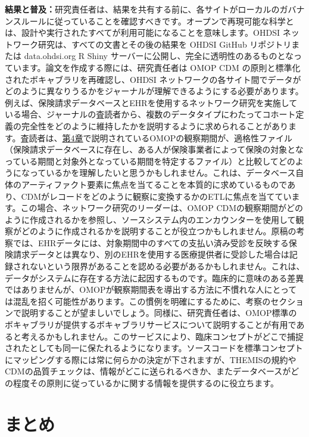 \documentclass[
  11pt]{book}
\theoremstyle{definition}
\theoremstyle{definition}
\theoremstyle{definition}
\theoremstyle{definition}
\theoremstyle{remark}
\begin{document}
\textbf{結果と普及：}研究責任者は、結果を共有する前に、各サイトがローカルのガバナンスルールに従っていることを確認すべきです。オープンで再現可能な科学とは、設計や実行されたすべてが利用可能になることを意味します。OHDSI ネットワーク研究は、すべての文書とその後の結果を OHDSI GitHub リポジトリまたは data.ohdsi.org R Shiny サーバーに公開し、完全に透明性のあるものとなっています。論文を作成する際には、研究責任者は OMOP CDM の原則と標準化されたボキャブラリを再確認し、OHDSI ネットワークの各サイト間でデータがどのように異なりうるかをジャーナルが理解できるようにする必要があります。例えば、保険請求データベースとEHRを使用するネットワーク研究を実施している場合、ジャーナルの査読者から、複数のデータタイプにわたってコホート定義の完全性をどのように維持したかを説明するように求められることがあります。査読者は、\href{https://ohdsi.github.io/TheBookOfOhdsi/CommonDataModel.html\#CommonDataModel}{第4章}で説明されているOMOPの観察期間が、適格性ファイル（保険請求データベースに存在し、ある人が保険事業者によって保険の対象となっている期間と対象外となっている期間を特定するファイル）と比較してどのようになっているかを理解したいと思うかもしれません。これは、データベース自体のアーティファクト要素に焦点を当てることを本質的に求めているものであり、CDMがレコードをどのように観察に変換するかのETLに焦点を当てています。この場合、ネットワーク研究のリーダーは、OMOP CDMの観察期間がどのように作成されるかを参照し、ソースシステム内のエンカウンターを使用して観察がどのように作成されるかを説明することが役立つかもしれません。原稿の考察では、EHRデータには、対象期間中のすべての支払い済み受診を反映する保険請求データとは異なり、別のEHRを使用する医療提供者に受診した場合は記録されないという限界があることを認める必要があるかもしれません。これは、データがシステムに存在する方法に起因するものです。臨床的に意味のある差異ではありませんが、OMOPが観察期間表を導出する方法に不慣れな人にとっては混乱を招く可能性があります。この慣例を明確にするために、考察のセクションで説明することが望ましいでしょう。同様に、研究責任者は、OMOP標準のボキャブラリが提供するボキャブラリサービスについて説明することが有用であると考えるかもしれません。このサービスにより、臨床コンセプトがどこで捕捉されたとしても同一に保たれるようになります。ソースコードを標準コンセプトにマッピングする際には常に何らかの決定が下されますが、THEMISの規約やCDMの品質チェックは、情報がどこに送られるべきか、またデータベースがどの程度その原則に従っているかに関する情報を提供するのに役立ちます。

\section{まとめ}\label{ux307eux3068ux3081-17}
\end{document}
